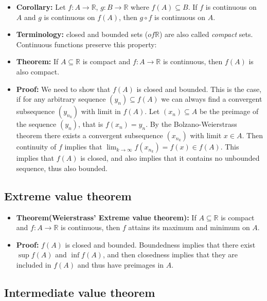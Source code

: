 \documentclass{article}
\begin{document}
\begin{itemize}
\item \textbf{Corollary:} Let $f: A \to \mathbb{R}$, $g: B \to \mathbb{R}$ where $f(A) \subseteq B$. If $f$ is continuous on $A$ and $g$ is continuous on $f(A)$, then $g \circ f$ is continuous on $A$.

\item \textbf{Terminology:} closed and bounded sets ($of \mathbb{R}$) are also called \emph{compact} sets. Continuous functions preserve this property:

\item \textbf{Theorem:} If $A \subseteq \mathbb{R}$ is compact and $f: A \to \mathbb{R}$ is continuous, then $f(A)$ is also compact.

\item \textbf{Proof:} We need to show that $f(A)$ is closed and bounded. This is the case, if for any arbitrary sequence $(y_n) \subseteq f(A)$ we can always find a convergent subsequence $(y_{n_k})$ with limit in $f(A)$. Let $(x_n) \subseteq A$ be the preimage of the sequence $(y_n)$, that is $f(x_n) = y_n$. By the Bolzano-Weierstrass theorem there exists a convergent subsequence $(x_{n_k})$ with limit $x \in A$. Then continuity of $f$ implies that $\displaystyle \lim_{k \to \infty}f(x_{n_k}) = f(x) \in f(A)$. This implies that $f(A)$ is closed, and also implies that it contains no unbounded sequence, thus also bounded.
\end{itemize}

\subsection{Extreme value theorem}

\begin{itemize}
\item \textbf{Theorem(Weierstrass' Extreme value theorem):} If $A \subseteq \mathbb{R}$ is compact and $f: A \to \mathbb{R}$ is continuous, then $f$ attains its maximum and minimum on $A$.

\item \textbf{Proof:} $f(A)$ is closed and bounded. Boundedness implies that there exist $\sup f(A)$ and $\inf f(A)$, and then closedness implies that they are included in $f(A)$ and thus have preimages in $A$.
\end{itemize}

\subsection{Intermediate value theorem}
\end{document}
